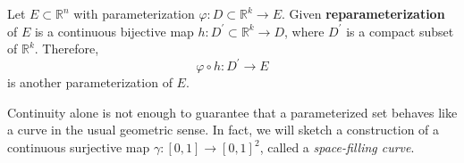 	\begin{definition}[Reparameterization]
	  \label{def:reparameterization}
		Let $E \subset \mathbb{R}^n$ with parameterization $\varphi: D \subset \mathbb{R}^k \to E$. Given \textbf{reparameterization} of $E$ is a continuous bijective map $h: D^\prime \subset \mathbb{R}^k \to D$, where $D^\prime$ is a compact subset of $\mathbb{R}^k$. Therefore, 
		\begin{equation}
		  \varphi \circ h : D^\prime \to E
		\end{equation} 
		is another parameterization of $E$. 
	\end{definition}
	
	
	Continuity alone is not enough to guarantee that a parameterized set behaves like a curve in the usual geometric sense. In fact, we will sketch a construction of a continuous surjective map $\gamma : [0,1] \to [0,1]^2$, called a \textit{space-filling curve}. 
	
